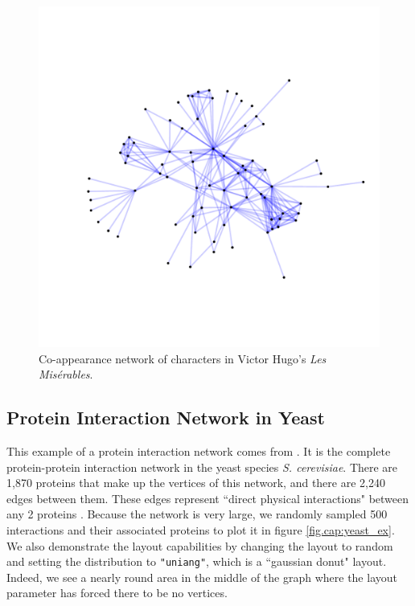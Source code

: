 \documentclass[11pt]{article}\usepackage[]{graphicx}\usepackage[]{color}
\begin{document}
\begin{figure}
\centering
\includegraphics[width=\textwidth]{figure/lesmis_ex-1.pdf}
\caption{\label{fig.cap:lesmis_ex} Co-appearance network of characters in Victor Hugo's \emph{Les Mis\'{e}rables}.}
\end{figure}
\afterpage{\clearpage}

  \subsection{Protein Interaction Network in Yeast}
  This example of a protein interaction network comes from \citet{protein}. It is the complete protein-protein interaction network in the yeast species \emph{S. cerevisiae}. There are 1,870 proteins that make up the vertices of this network, and there are 2,240 edges between them.  These edges represent ``direct physical interactions" between any 2 proteins \citep[][p. 42]{protein}. Because the network is very large, we randomly sampled 500 interactions and their associated proteins to plot it in figure \ref{fig.cap:yeast_ex}.  We also demonstrate the layout capabilities by changing the layout to random and setting the distribution to \texttt{"uniang"}, which is a  ``gaussian donut" layout.  Indeed, we see a nearly round area in the middle of the graph where the layout parameter has forced there to be no vertices.
\end{document}
